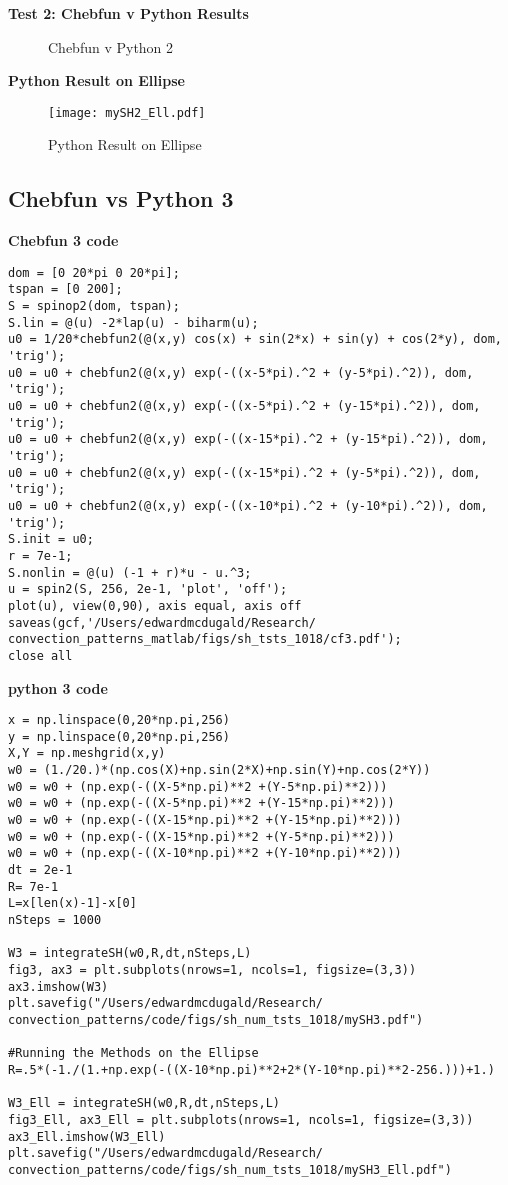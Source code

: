 \documentclass[12pt]{article}
\begin{document}
\textbf{Test 2: Chebfun v Python Results}
\begin{figure}[!tbp]
  \centering
  \hfill
  \caption{Chebfun v Python 2}
\end{figure}
\FloatBarrier

\textbf{Python Result on Ellipse}
\begin{figure}[ht]
        \centering
        \texttt{[image: mySH2\_Ell.pdf]}
        \label{fig:1}
        \caption{Python Result on Ellipse}
\end{figure}
\FloatBarrier

\subsection{Chebfun vs Python 3}
\textbf{Chebfun 3 code}
\begin{verbatim}
dom = [0 20*pi 0 20*pi];
tspan = [0 200];
S = spinop2(dom, tspan);
S.lin = @(u) -2*lap(u) - biharm(u);
u0 = 1/20*chebfun2(@(x,y) cos(x) + sin(2*x) + sin(y) + cos(2*y), dom, 'trig');
u0 = u0 + chebfun2(@(x,y) exp(-((x-5*pi).^2 + (y-5*pi).^2)), dom, 'trig');
u0 = u0 + chebfun2(@(x,y) exp(-((x-5*pi).^2 + (y-15*pi).^2)), dom, 'trig');
u0 = u0 + chebfun2(@(x,y) exp(-((x-15*pi).^2 + (y-15*pi).^2)), dom, 'trig');
u0 = u0 + chebfun2(@(x,y) exp(-((x-15*pi).^2 + (y-5*pi).^2)), dom, 'trig');
u0 = u0 + chebfun2(@(x,y) exp(-((x-10*pi).^2 + (y-10*pi).^2)), dom, 'trig');
S.init = u0;
r = 7e-1;
S.nonlin = @(u) (-1 + r)*u - u.^3;
u = spin2(S, 256, 2e-1, 'plot', 'off');
plot(u), view(0,90), axis equal, axis off
saveas(gcf,'/Users/edwardmcdugald/Research/
convection_patterns_matlab/figs/sh_tsts_1018/cf3.pdf');
close all
\end{verbatim}

\textbf{python 3 code}
\begin{verbatim}
x = np.linspace(0,20*np.pi,256)
y = np.linspace(0,20*np.pi,256)
X,Y = np.meshgrid(x,y)
w0 = (1./20.)*(np.cos(X)+np.sin(2*X)+np.sin(Y)+np.cos(2*Y))
w0 = w0 + (np.exp(-((X-5*np.pi)**2 +(Y-5*np.pi)**2)))
w0 = w0 + (np.exp(-((X-5*np.pi)**2 +(Y-15*np.pi)**2)))
w0 = w0 + (np.exp(-((X-15*np.pi)**2 +(Y-15*np.pi)**2)))
w0 = w0 + (np.exp(-((X-15*np.pi)**2 +(Y-5*np.pi)**2)))
w0 = w0 + (np.exp(-((X-10*np.pi)**2 +(Y-10*np.pi)**2)))
dt = 2e-1
R= 7e-1
L=x[len(x)-1]-x[0]
nSteps = 1000

W3 = integrateSH(w0,R,dt,nSteps,L)
fig3, ax3 = plt.subplots(nrows=1, ncols=1, figsize=(3,3))
ax3.imshow(W3)
plt.savefig("/Users/edwardmcdugald/Research/
convection_patterns/code/figs/sh_num_tsts_1018/mySH3.pdf")

#Running the Methods on the Ellipse
R=.5*(-1./(1.+np.exp(-((X-10*np.pi)**2+2*(Y-10*np.pi)**2-256.)))+1.)

W3_Ell = integrateSH(w0,R,dt,nSteps,L)
fig3_Ell, ax3_Ell = plt.subplots(nrows=1, ncols=1, figsize=(3,3))
ax3_Ell.imshow(W3_Ell)
plt.savefig("/Users/edwardmcdugald/Research/
convection_patterns/code/figs/sh_num_tsts_1018/mySH3_Ell.pdf")
\end{verbatim}
\FloatBarrier
\end{document}
